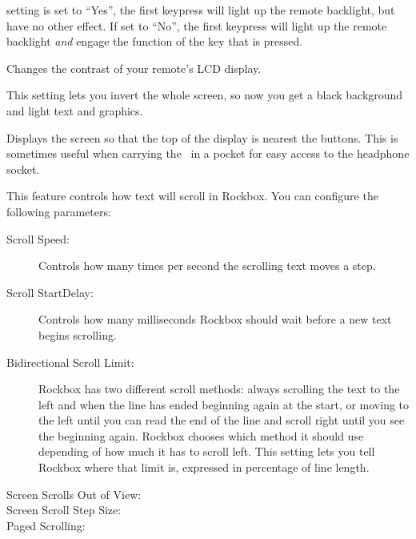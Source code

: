 \begin{description}
{\begin{description}
{          setting is set to ``Yes'', the first keypress will light up the 
          remote backlight, but have no other effect.  If set to ``No'', 
          the first keypress will light up the remote backlight 
          \emph{and} engage the function of the key that is pressed.
       \item[Contrast:]
         Changes the contrast of your remote's LCD display. 
       \item[LCD Mode:]
         This setting lets you invert the whole screen, so now you get a 
         black background and light text and graphics.
       \item[Upside Down:]
         Displays the screen so that the top of the display is nearest 
         the buttons.  This is sometimes useful when carrying the \dap\ in a 
         pocket for easy access to the headphone socket.
      }
    \end{description}
		}
  \item[Scrolling]
    This feature controls how text will scroll in Rockbox. You can configure 
    the following parameters:
    \begin{description}
    \item[Scroll Speed:]
      Controls how many times per second the scrolling text moves a step.
    \item[Scroll StartDelay:]
      Controls how many milliseconds Rockbox should wait before a new 
      text begins scrolling.
    \item[Bidirectional Scroll Limit:]
      Rockbox has two different scroll methods: always scrolling the text 
      to the left and when the line has ended beginning again at the start, 
      or moving to the left until you can read the end of the line and scroll 
      right until you see the beginning again. Rockbox chooses which method 
      it should use depending of how much it has to scroll left. This setting 
      lets you tell Rockbox where that limit is, expressed in percentage of 
      line length.
    \item[Screen Scrolls Out of View:] 
    \item[Screen Scroll Step Size:] 
    \item[Paged Scrolling:] 

\end{description}
\end{description}
